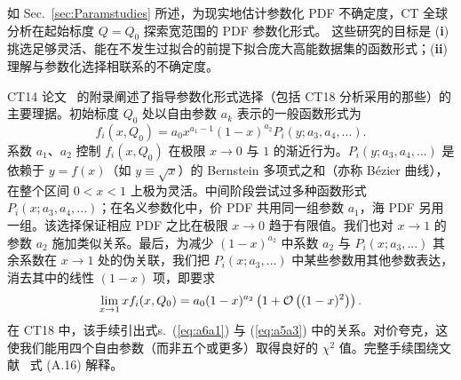 如 Sec.~\ref{sec:Paramstudies} 所述，为现实地估计参数化 PDF 不确定度，CT 全球分析在起始标度 $Q\! =\! Q_0$ 探索宽范围的 PDF 参数化形式。
这些研究的目标是 ({\bf i}) 挑选足够灵活、能在不发生过拟合的前提下拟合庞大高能数据集的函数形式；({\bf ii}) 理解与参数化选择相联系的不确定度。

CT14 论文~\cite{Dulat:2015mca} 的附录阐述了指导参数化形式选择（包括 CT18 分析采用的那些）的主要理据。初始标度 $Q_0$ 处以自由参数 $a_k$ 表示的一般函数形式为
\begin{equation}
    f_i(x,Q_0) = a_0 x^{a_1-1} (1-x)^{a_2} P_i(y; a_3, a_4,...).
    \label{eq:fiQ0}
\end{equation}
系数 $a_1$、$a_2$ 控制 $f_i(x,Q_0)$ 在极限 $x\rightarrow 0$ 与 $1$ 的渐近行为。$P_i(y;a_3,a_4, ...)$ 是依赖于 $y=f(x)$（如 $y\equiv \sqrt{x}$）的 Bernstein 多项式之和（亦称 B\'ezier 曲线），在整个区间 $0<x<1$ 上极为灵活。中间阶段尝试过多种函数形式 $P_i(x; a_3, a_4,...)$；在名义参数化中，价 PDF 共用同一组参数 $a_1$，海 PDF 另用一组。该选择保证相应 PDF 之比在极限 $x\to 0$ 趋于有限值。我们也对 $x\to 1$ 的参数 $a_2$ 施加类似关系。最后，为减少 $(1-x)^{a_2}$ 中系数 $a_2$ 与 $P_i(x;a_3,...)$ 其余系数在 $x\rightarrow 1$ 处的伪关联，我们把 $P_i(x;a_3,...)$ 中某些参数用其他参数表达，消去其中的线性 $(1-x)$ 项，即要求
\begin{equation}
    \lim_{x\to 1} xf_i(x,Q_0) = a_0 (1-x)^{a_2} \left(1 + {\cal O}\left((1-x)^2\right)\right).
    \label{PixTo1}
\end{equation}
在 CT18 中，该手续引出式s.~(\ref{eq:a6a1}) 与 (\ref{eq:a5a3}) 中的关系。对价夸克，这使我们能用四个自由参数（而非五个或更多）取得良好的 $\chi^2$ 值。完整手续围绕文献~\cite{Dulat:2015mca} 式 (A.16) 解释。


